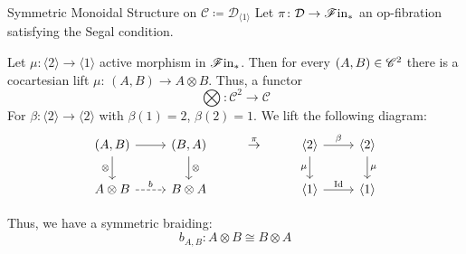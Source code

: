 \begin{frame}[fragile]{Symmetric Monoidal Structure on $\mathcal{C} \coloneqq \mathcal{D}_{\langle 1 \rangle}$}
Let $\pi \colon \mathcal{D} \to \mathscr{F} \text{in}_{\ast}$ an op-fibration satisfying the Segal condition.

Let $\mu \colon \langle 2 \rangle \to \langle 1 \rangle$ active morphism in $\mathscr{F} \text{in}_{\ast}$.
Then for every $(A,B) \in \mathscr{C}^2$ there is a cocartesian lift $\mu$: $(A,B) \to A \otimes B$.
Thus, a functor
\[
   \bigotimes \colon \mathcal{C}^2 \rightarrow \mathcal{C}
\]
For $\beta \colon  \langle 2 \rangle \to \langle 2 \rangle$ with $\beta(1)=2$, $\beta(2)=1$. We lift the following diagram:
\[
\begin{tikzcd}
{(A,B)} \arrow[r] \arrow[d, "\otimes"'] & {(B,A)} \arrow[d, "\otimes"] & {\overset{\pi}{\rightarrow}} & \langle 2 \rangle \arrow[d, "\mu"'] \arrow[r, "\beta"] & \langle 2 \rangle \arrow[d, "\mu"] \\
A \otimes B \arrow[r, "b", dashed]      & B \otimes A                  &  & \langle 1 \rangle \arrow[r, "\id"]                     & \langle 1 \rangle                 
\end{tikzcd}
\]

Thus, we have a symmetric braiding:
\[
  b_{A,B} \colon A \otimes B \cong B \otimes A
\]  
\end{frame}

  

